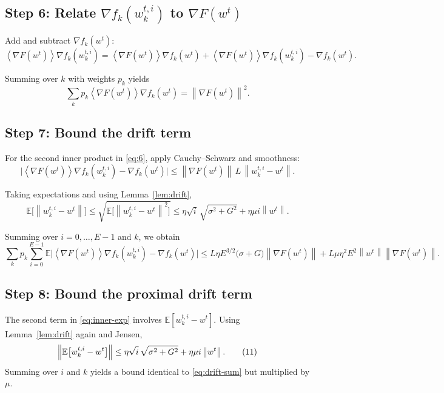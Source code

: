 \documentclass{article}
\newcommand{\E}{\mathbb{E}}
\newcommand{\norm}[1]{\left\lVert#1\right\rVert}
\newcommand{\inner}[1]{\left\langle#1\right\rangle}
\begin{document}
\subsection*{Step 6: Relate $\nabla f_k(w_{k}^{t,i})$ to $\nabla F(w^{t})$}
Add and subtract $\nabla f_k(w^{t})$:
\[
\inner{\nabla F(w^{t})}{\nabla f_k(w_{k}^{t,i})}
= \inner{\nabla F(w^{t})}{\nabla f_k(w^{t})}
  +\inner{\nabla F(w^{t})}{\nabla f_k(w_{k}^{t,i})-\nabla f_k(w^{t})}.
\tag{6}
\label{eq:grad-decompose}
\]

Summing over $k$ with weights $p_k$ yields
\[
\sum_{k}p_k\inner{\nabla F(w^{t})}{\nabla f_k(w^{t})}
= \norm{\nabla F(w^{t})}^{2}.
\tag{7}
\label{eq:grad-sum}
\]

\subsection*{Step 7: Bound the drift term}
For the second inner product in \eqref{eq:6}, apply Cauchy–Schwarz
and smoothness:
\[
\bigl|\inner{\nabla F(w^{t})}{\nabla f_k(w_{k}^{t,i})-\nabla f_k(w^{t})}\bigr|
\le \norm{\nabla F(w^{t})}\,L\,\norm{w_{k}^{t,i}-w^{t}}.
\tag{8}
\label{eq:cauchy}
\]

Taking expectations and using Lemma~\ref{lem:drift},
\[
\E\!\bigl[\norm{w_{k}^{t,i}-w^{t}}\bigr]
\le \sqrt{\E\!\bigl[\norm{w_{k}^{t,i}-w^{t}}^{2}\bigr]}
\le \eta\sqrt{i}\,\sqrt{\sigma^{2}+G^{2}} + \eta\mu i \norm{w^{t}}.
\tag{9}
\label{eq:drift-bound}
\]

Summing over $i=0,\dots,E-1$ and $k$, we obtain
\[
\sum_{k}p_k\sum_{i=0}^{E-1}
   \E\!\bigl|\inner{\nabla F(w^{t})}{\nabla f_k(w_{k}^{t,i})-\nabla f_k(w^{t})}\bigr|
\le L\eta E^{3/2}\bigl(\sigma+G\bigr)\norm{\nabla F(w^{t})}
   + L\mu\eta^{2}E^{2}\norm{w^{t}}\norm{\nabla F(w^{t})}.
\tag{10}
\label{eq:drift-sum}
\]

\subsection*{Step 8: Bound the proximal drift term}
The second term in \eqref{eq:inner-exp} involves $\E[w_{k}^{t,i}-w^{t}]$.
Using Lemma~\ref{lem:drift} again and Jensen,
\[
\Bigl\|\E\bigl[w_{k}^{t,i}-w^{t}\bigr]\Bigr\|
\le \eta\sqrt{i}\,\sqrt{\sigma^{2}+G^{2}} + \eta\mu i \norm{w^{t}} .
\tag{11}
\label{eq:prox-drift}
\]
Summing over $i$ and $k$ yields a bound identical to \eqref{eq:drift-sum}
but multiplied by $\mu$.
\end{document}
